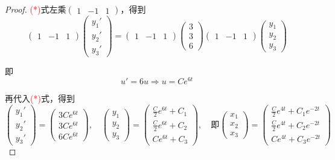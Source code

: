\begin{proof}
\textcolor{red}{(*)}式左乘$ \begin{pmatrix}1&-1&1\end{pmatrix} $，得到
$$ \begin{pmatrix}1&-1&1\end{pmatrix} 
\begin{pmatrix}y_1'\\y_2'\\y_3'\end{pmatrix}
= \begin{pmatrix}1&-1&1\end{pmatrix} 
\begin{pmatrix}3\\3\\6\end{pmatrix} \begin{pmatrix}1&-1&1\end{pmatrix} 
\begin{pmatrix}y_1\\y_2\\y_3\end{pmatrix} $$

即$$ u' = 6 u \Rightarrow u = C e^{6t} $$

再代入\textcolor{red}{(*)}式，得到$$  
\begin{pmatrix}y_1'\\y_2'\\y_3'\end{pmatrix} =
\begin{pmatrix} 3C e^{6t}\\3C e^{6t}\\6C e^{6t}\end{pmatrix} ,\quad 
\begin{pmatrix}y_1\\y_2\\y_3\end{pmatrix} =
\begin{pmatrix}\frac{C}{2}e^{6t}+C_1\\\frac{C}{2} e^{6t}+C_2\\C e^{6t}+C_3
 \end{pmatrix}   ,\quad \text{即}
\begin{pmatrix}x_1\\x_2\\x_3\end{pmatrix} =
\begin{pmatrix}\frac{C}{2}e^{4t}+C_1e^{-2t} \\\frac{C}{2} e^{4t}+C_2e^{-2t} \\C e^{4t}+C_3e^{-2t} 
 \end{pmatrix}   
$$
\end{proof}

